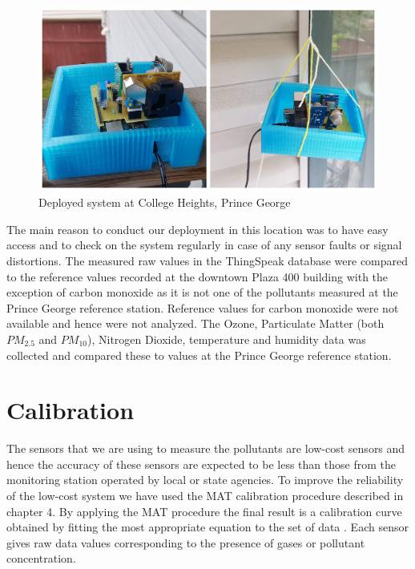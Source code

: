 \begin{figure}[h]
    \begin{center}
    \includegraphics[scale=0.30]{images/figure20.jpg}
    \end{center}
    \caption{Deployed system at College Heights, Prince George}
    \label{deployed}

  \end{figure} 


  The main reason to conduct our deployment in this location was to have easy access and to check on the system regularly in case of any sensor faults or signal distortions. The measured raw values in the ThingSpeak database were compared to the reference values recorded at the downtown Plaza 400 building with the exception of carbon monoxide as it is not one of the pollutants measured at the Prince George reference station. Reference values for carbon monoxide were not available and hence were not analyzed. The Ozone, Particulate Matter (both $PM_{2.5}$ and $PM_{10}$), Nitrogen Dioxide, temperature and humidity data was collected and compared these to values at the Prince George reference station.


\section{Calibration}

The sensors that we are using to measure the pollutants are low-cost sensors and hence the accuracy of these sensors are expected to be less than those from the monitoring station operated by local or state agencies. To improve the reliability of the low-cost system we have used the MAT calibration procedure described in chapter 4. By applying the MAT procedure the final result is a calibration curve obtained by fitting the most appropriate equation to the set of data \cite{Stone2001}. Each sensor gives raw data values corresponding to the presence of gases or pollutant concentration.

